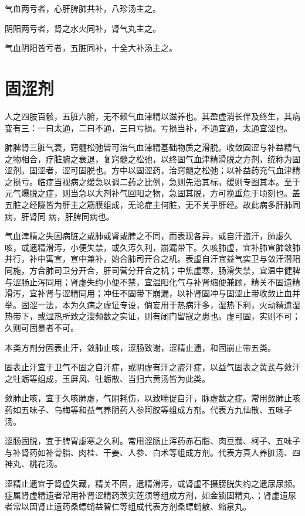 \documentclass[UTF8]{ctexart}
\begin{document}
气血两亏者，心肝脾肺共补，八珍汤主之。

阴阳两亏者，肾之水火同补，肾气丸主之。

气血阴阳皆亏者，五脏同补，十全大补汤主之。

\section{固涩剂}
人之四肢百骸，五脏六腑，无不赖气血津精以滋养也。其盈虚消长伴及终生，其病变有三：一曰太通，二曰不通，三曰亏损。亏损当补，不通宜通，太通宜涩也。

肺脾肾三脏气衰，窍髓松弛皆可治气血津精基础物质之滑脱。收敛固涩与补益精气之物相合，疗脏腑之衰退，复窍髓之松弛，以终固气血津精滑脱之方剂，统称为固涩剂。固涩者，涩可固脱也。方中以固涩药，治窍髓之松弛；以补益药充气血津精之损亏。临症当视病之缓急以调二药之比例，急则先治其标，缓则专图其本。至于元气爆脱之症，则当急以大剂补气回阳之物，急固其脱，方可挽垂危于顷刻也。盖五脏之经隧皆为肝主之筋膜组成，无论症主何脏，无不关乎肝经。故此病多肝肺同病，肝肾同 病，肝脾同病也。

气血津精之失因病脏之或肺或肾或脾之不同，而表现各异，或自汗盗汗，肺虚久咳，或遗精滑泻，小便失禁，或久泻久利，崩漏带下。久咳肺虚，宜补肺宣肺敛肺并行，补中寓宣，宣中兼补，始合肺司开合之机。表虚自汗宜益气实卫与敛汗潜阳同施，方合肺司卫分开合，肝司营分开合之机；中焦虚寒，肠滑失禁，宜温中健脾与涩肠止泻同用；肾虚失约小便不禁，宜温阳化气与补肾缩便兼顾，精关不固遗精滑泻，宜补肾与涩精同用；冲任不固带下崩漏，以补肾固冲与固涩止带收敛止血并举。固涩一法，本为久病之虚证专设，倘妄用于热病汗多，湿热下利，火动精遗湿热带下，或湿热所致之溲频数之实证，则有闭门留寇之患也。虚可固，实则不可；久则可固暴者不可。

本类方剂分固表止汗，敛肺止咳，涩肠致谢，涩精止遗，和固崩止带五类。

固表止汗宜于卫气不固之自汗症，或阴虚有汗之盗汗症，以益气固表之黄芪与敛汗之牡蛎等组成，玉屏风、牡蛎散、当归六黄汤皆为此类。

敛肺止咳，宜于久咳肺虚，气阴耗伤，以致喘促自汗，脉虚数之症。常用敛肺止咳药如五味子、乌梅等和益气养阴药人参阿胶等组成方剂。代表方九仙散、五味子汤。

涩肠固脱，宜于脾胃虚寒之久利。常用涩肠止泻药赤石脂、肉豆蔻、柯子、五味子与补肾药如补骨脂、肉桂、干姜、人参、白术等组成方剂。代表方真人养脏汤、四神丸、桃花汤。

涩精止遗宜于肾虚失藏，精关不固，遗精滑泻，或肾虚不摄膀胱失约之遗尿尿频。症属肾虚精遗者常用补肾涩精药茨实莲须等组成方剂，如金锁固精丸、；肾虚遗尿者常以固肾止遗药桑螵蛸益智仁等组成代表方剂桑螵蛸散、缩泉丸。
\end{document}
